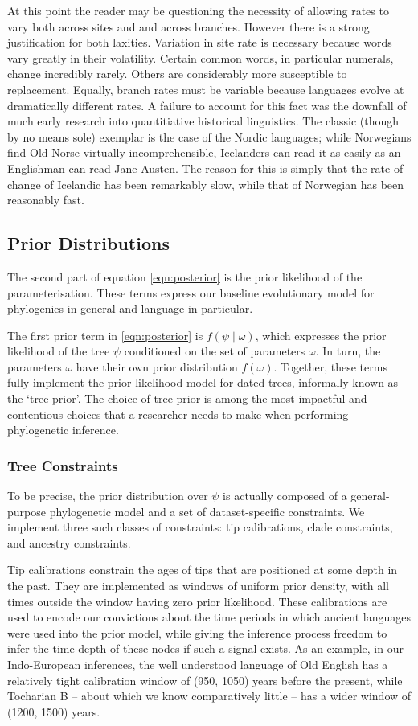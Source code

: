 \documentclass[10pt,journal,compsoc]{IEEEtran}
\begin{document}
At this point the reader may be questioning the necessity of allowing rates to vary both across sites and and across branches. However there is a strong justification for both laxities. Variation in site rate is necessary because words vary greatly in their volatility. Certain common words, in particular numerals, change incredibly rarely. Others are considerably more susceptible to replacement. Equally, branch rates must be variable because languages evolve at dramatically different rates. A failure to account for this fact was the downfall of much early research into quantitiative historical linguistics. The classic (though by no means sole) exemplar is the case of the Nordic languages; while Norwegians find Old Norse virtually incomprehensible, Icelanders can read it as easily as an Englishman can read Jane Austen. The reason for this is simply that the rate of change of Icelandic has been remarkably slow, while that of Norwegian has been reasonably fast.

\subsection{Prior Distributions}

The second part of equation \eqref{eqn:posterior} is the prior likelihood of the parameterisation. These terms express our baseline evolutionary model for phylogenies in general and language in particular.

The first prior term in \eqref{eqn:posterior} is $f(\psi\;|\;\omega)$, which expresses the prior likelihood of the tree $\psi$ conditioned on the set of parameters $\omega$. In turn, the parameters $\omega$ have their own prior distribution $f(\omega)$. Together, these terms fully implement the prior likelihood model for dated trees, informally known as the `tree prior'. The choice of tree prior is among the most impactful and contentious choices that a researcher needs to make when performing phylogenetic inference.

\subsubsection{Tree Constraints}

To be precise, the prior distribution over $\psi$ is actually composed of a general-purpose phylogenetic model and a set of dataset-specific constraints. We implement three such classes of constraints: tip calibrations, clade constraints, and ancestry constraints.

Tip calibrations constrain the ages of tips that are positioned at some depth in the past. They are implemented as windows of uniform prior density, with all times outside the window having zero prior likelihood. These calibrations are used to encode our convictions about the time periods in which ancient languages were used into the prior model, while giving the inference process freedom to infer the time-depth of these nodes if such a signal exists. As an example, in our Indo-European inferences, the well understood language of Old English has a relatively tight calibration window of (950, 1050) years before the present, while Tocharian B -- about which we know comparatively little -- has a wider window of (1200, 1500) years.
\end{document}
